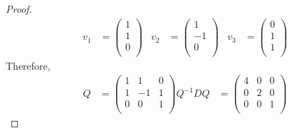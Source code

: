 \documentclass[../psets.tex]{subfiles}
\begin{document}
\begin{enumerate}
\begin{proof}
        \begin{align*}
            v_1 &=
            \begin{pmatrix}
                1\\
                1\\
                0\\
            \end{pmatrix}&
            v_2 &=
            \begin{pmatrix}
                1\\
                -1\\
                0\\
            \end{pmatrix}&
            v_3 &=
            \begin{pmatrix}
                0\\
                1\\
                1\\
            \end{pmatrix}
        \end{align*}
        Therefore,
        \begin{align*}
            Q &=
            \begin{pmatrix}
                1 & 1 & 0\\
                1 & -1 & 1\\
                0 & 0 & 1\\
            \end{pmatrix}
            Q^{-1}DQ &=
            \begin{pmatrix}
                4 & 0 & 0\\
                0 & 2 & 0\\
                0 & 0 & 1\\
            \end{pmatrix}
        \end{align*}
    \end{proof}
\end{enumerate}
\end{document}
